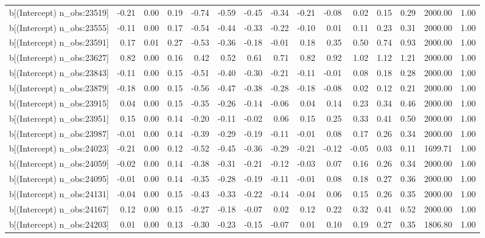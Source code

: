 \begin{table}[ht]
\begin{tabular}{rrrrrrrrrrrrrrr}
  b[(Intercept) n\_obs:23519] & -0.21 & 0.00 & 0.19 & -0.74 & -0.59 & -0.45 & -0.34 & -0.21 & -0.08 & 0.02 & 0.15 & 0.29 & 2000.00 & 1.00 \\ 
  b[(Intercept) n\_obs:23555] & -0.11 & 0.00 & 0.17 & -0.54 & -0.44 & -0.33 & -0.22 & -0.10 & 0.01 & 0.11 & 0.23 & 0.31 & 2000.00 & 1.00 \\ 
  b[(Intercept) n\_obs:23591] & 0.17 & 0.01 & 0.27 & -0.53 & -0.36 & -0.18 & -0.01 & 0.18 & 0.35 & 0.50 & 0.74 & 0.93 & 2000.00 & 1.00 \\ 
  b[(Intercept) n\_obs:23627] & 0.82 & 0.00 & 0.16 & 0.42 & 0.52 & 0.61 & 0.71 & 0.82 & 0.92 & 1.02 & 1.12 & 1.21 & 2000.00 & 1.00 \\ 
  b[(Intercept) n\_obs:23843] & -0.11 & 0.00 & 0.15 & -0.51 & -0.40 & -0.30 & -0.21 & -0.11 & -0.01 & 0.08 & 0.18 & 0.28 & 2000.00 & 1.00 \\ 
  b[(Intercept) n\_obs:23879] & -0.18 & 0.00 & 0.15 & -0.56 & -0.47 & -0.38 & -0.28 & -0.18 & -0.08 & 0.02 & 0.12 & 0.21 & 2000.00 & 1.00 \\ 
  b[(Intercept) n\_obs:23915] & 0.04 & 0.00 & 0.15 & -0.35 & -0.26 & -0.14 & -0.06 & 0.04 & 0.14 & 0.23 & 0.34 & 0.46 & 2000.00 & 1.00 \\ 
  b[(Intercept) n\_obs:23951] & 0.15 & 0.00 & 0.14 & -0.20 & -0.11 & -0.02 & 0.06 & 0.15 & 0.25 & 0.33 & 0.41 & 0.50 & 2000.00 & 1.00 \\ 
  b[(Intercept) n\_obs:23987] & -0.01 & 0.00 & 0.14 & -0.39 & -0.29 & -0.19 & -0.11 & -0.01 & 0.08 & 0.17 & 0.26 & 0.34 & 2000.00 & 1.00 \\ 
  b[(Intercept) n\_obs:24023] & -0.21 & 0.00 & 0.12 & -0.52 & -0.45 & -0.36 & -0.29 & -0.21 & -0.12 & -0.05 & 0.03 & 0.11 & 1699.71 & 1.00 \\ 
  b[(Intercept) n\_obs:24059] & -0.02 & 0.00 & 0.14 & -0.38 & -0.31 & -0.21 & -0.12 & -0.03 & 0.07 & 0.16 & 0.26 & 0.34 & 2000.00 & 1.00 \\ 
  b[(Intercept) n\_obs:24095] & -0.01 & 0.00 & 0.14 & -0.35 & -0.28 & -0.19 & -0.11 & -0.01 & 0.08 & 0.18 & 0.27 & 0.36 & 2000.00 & 1.00 \\ 
  b[(Intercept) n\_obs:24131] & -0.04 & 0.00 & 0.15 & -0.43 & -0.33 & -0.22 & -0.14 & -0.04 & 0.06 & 0.15 & 0.26 & 0.35 & 2000.00 & 1.00 \\ 
  b[(Intercept) n\_obs:24167] & 0.12 & 0.00 & 0.15 & -0.27 & -0.18 & -0.07 & 0.02 & 0.12 & 0.22 & 0.32 & 0.41 & 0.52 & 2000.00 & 1.00 \\ 
  b[(Intercept) n\_obs:24203] & 0.01 & 0.00 & 0.13 & -0.30 & -0.23 & -0.15 & -0.07 & 0.01 & 0.10 & 0.19 & 0.27 & 0.35 & 1806.80 & 1.00 \\ 

\end{tabular}
\end{table}

